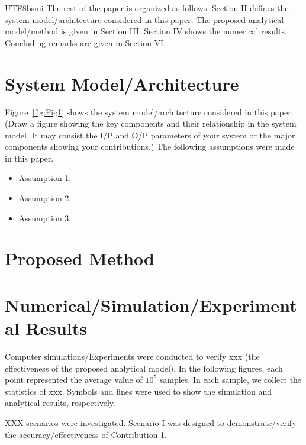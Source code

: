 \documentclass[conference]{IEEEtran}
\begin{document}
\begin{CJK}{UTF8}{bsmi}
The rest of the paper is organized as follows. Section II defines the system model/architecture considered in this paper. The proposed analytical model/method is given in Section III. Section IV shows the numerical results. Concluding remarks are given in Section VI.

\section{System Model/Architecture}

Figure~\ref{fig:Fig1} shows the system model/architecture considered in this paper.
(Draw a figure showing the key components and their relationship in the system model. It may consist the I/P and O/P parameters of your system or the major components showing your contributions.) 
The following assumptions were made in this paper.
\begin{itemize}
\item Assumption 1.
\item Assumption 2. 
\item Assumption 3. 
\end{itemize}

\section{Proposed Method}
\section{Numerical/Simulation/Experimental Results}
Computer simulations/Experiments were conducted to verify xxx (the effectiveness of the proposed analytical model). 
In the following figures, each point represented the average value of $10^5$ samples. In each sample, we collect the statistics of xxx. Symbols and lines were used to show the simulation and analytical results, respectively. 

XXX scenarios were investigated. Scenario I was designed to demonstrate/verify the accuracy/effectiveness of Contribution 1.


\end{CJK}
\end{document}
